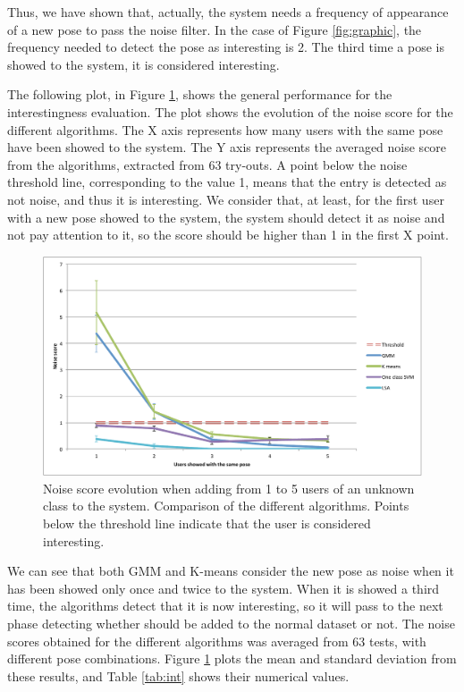 Thus, we have shown that, actually, the system needs a frequency of appearance of a new pose to pass the noise filter.  In the case of Figure \ref{fig:graphic}, the frequency needed to detect the pose as interesting is 2. The third time a pose is showed to the system, it is considered interesting.

The following plot, in Figure \ref{fig:chart}, shows the general performance for the interestingness evaluation.  The plot shows the evolution of the noise score for the different algorithms. The X axis represents how many users with the same pose have been showed to the system. The Y axis represents the averaged noise score from the algorithms, extracted from 63 try-outs. A point below the noise threshold line, corresponding to the value 1, means that the entry is detected as not noise, and thus it is interesting. We consider that, at least, for the first user with a new pose showed to the system, the system should detect it as noise and not pay attention to it, so the score should be higher than 1 in the first X point.

\begin{figure}[h]
\includegraphics[width=14cm]{Figures/results_imp/Chart}
\centering
\caption[Noise score evolution when adding from 1 to 5 users of an unknown class to the system]{Noise score evolution when adding from 1 to 5 users of an unknown class to the system. Comparison of the different algorithms. Points below the threshold line indicate that the user is considered interesting. \label{fig:chart} }
\end{figure}

We can see that both GMM and K-means consider the new pose as noise when it has been showed only once and twice to the system. When it is showed a third time, the algorithms detect that it is now interesting, so it will pass to the next phase detecting whether should be added to the normal dataset or not. The noise scores obtained for the different algorithms was averaged from 63 tests, with different pose combinations. Figure \ref{fig:chart} plots the mean and standard deviation from these results, and Table \ref{tab:int} shows their numerical values. 

